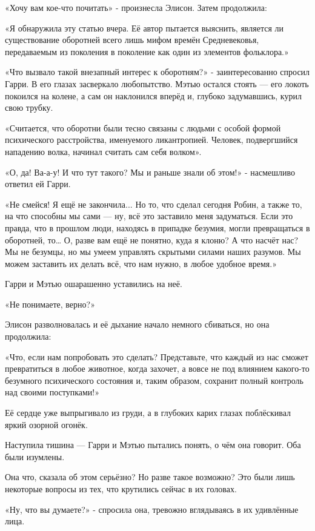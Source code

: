 \documentclass[a5paper, 9pt,
final, openany, twoside=true]{memoir}
\begin{document}
«Хочу вам кое-что почитать» - произнесла Элисон. Затем продолжила:

«Я обнаружила эту статью вчера. Её автор пытается выяснить, является ли существование оборотней всего лишь мифом времён Средневековья, передаваемым из поколения в поколение как один из элементов фольклора.»\bigskip

«Что вызвало такой внезапный интерес к оборотням?» - заинтересованно спросил Гарри. В его глазах засверкало любопытство. Мэтью остался стоять — его локоть покоился на колене, а сам он наклонился вперёд и, глубоко задумавшись, курил свою трубку.

«Считается, что оборотни были тесно связаны с людьми с особой формой психического расстройства, именуемого ликантропией. Человек, подвергшийся нападению волка, начинал считать сам себя волком».

«О, да! Ва-а-у! И что тут такого? Мы и раньше знали об этом!» - насмешливо ответил ей Гарри.

«Не смейся! Я ещё не закончила... Но то, что сделал сегодня Робин, а также то, на что способны мы сами — ну, всё это заставило меня задуматься. Если это правда, что в прошлом люди, находясь в припадке безумия, могли превращаться в оборотней, то… О, разве вам ещё не понятно, куда я клоню? А что насчёт нас? Мы не безумцы, но мы умеем управлять скрытыми силами наших разумов. Мы можем заставить их делать всё, что нам нужно, в любое удобное время.»

Гарри и Мэтью ошарашенно уставились на неё.

«Не понимаете, верно?»

Элисон разволновалась и её дыхание начало немного сбиваться, но она продолжила:

«Что, если нам попробовать это сделать? Представьте, что каждый из нас сможет превратиться в любое животное, когда захочет, а вовсе не под влиянием какого-то безумного психического состояния и, таким образом, сохранит полный контроль над своими поступками!»\bigskip

Её сердце уже выпрыгивало из груди, а в глубоких карих глазах поблёскивал яркий озорной огонёк.

Наступила тишина — Гарри и Мэтью пытались понять, о чём она говорит. Оба были изумлены.

Она что, сказала об этом серьёзно? Но разве такое возможно? Это были лишь некоторые вопросы из тех, что крутились сейчас в их головах.

«Ну, что вы думаете?» - спросила она, тревожно вглядываясь в их удивлённые лица.
\end{document}
